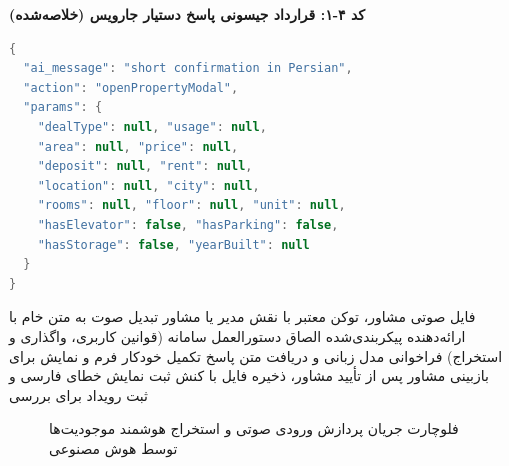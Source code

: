 \documentclass[11pt, a4paper]{report}
\begin{document}
\noindent\textbf{کد ۴-۱: قرارداد جیسونی پاسخ دستیار جارویس (خلاصه‌شده)}
\begin{otherlanguage}{english}
\begin{lstlisting}[language=Java]
{
  "ai_message": "short confirmation in Persian",
  "action": "openPropertyModal",
  "params": {
    "dealType": null, "usage": null,
    "area": null, "price": null,
    "deposit": null, "rent": null,
    "location": null, "city": null,
    "rooms": null, "floor": null, "unit": null,
    "hasElevator": false, "hasParking": false,
    "hasStorage": false, "yearBuilt": null
  }
}
\end{lstlisting}
\end{otherlanguage}

\begin{algorithm}[htbp]
\caption{خط لوله تبدیل صوت به فایل ملکی ذخیره‌شده}
\label{alg:stt_extract}
\begin{algorithmic}[1]
\REQUIRE فایل صوتی مشاور، توکن معتبر با نقش مدیر یا مشاور
\STATE تبدیل صوت به متن خام با ارائه‌دهنده پیکربندی‌شده
\STATE الصاق دستورالعمل سامانه (قوانین کاربری، واگذاری و استخراج)
\STATE فراخوانی مدل زبانی و دریافت متن پاسخ
\STATE تکمیل خودکار فرم و نمایش برای بازبینی مشاور
\STATE پس از تأیید مشاور، ذخیره فایل با کنش ثبت
\ELSE
\STATE نمایش خطای فارسی و ثبت رویداد برای بررسی
\ENDIF
\end{algorithmic}
\end{algorithm}

\begin{figure}[htbp]
  \centering
  \caption{فلوچارت جریان پردازش ورودی صوتی و استخراج هوشمند موجودیت‌ها توسط هوش مصنوعی}
  \label{fig:ai_flow}
\end{figure}
\end{document}
